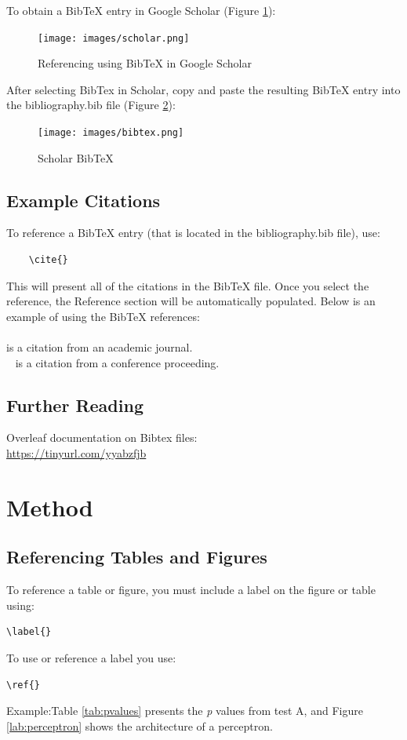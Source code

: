 \documentclass[12pt]{article}
\begin{document}
To obtain a BibTeX entry in Google Scholar (Figure \ref{lab:scholarBibTeX}):
\begin{figure}[ht!]
 	\centering
 	\caption{Referencing using BibTeX in Google Scholar}
 	\texttt{[image: images/scholar.png]}
 	\label{lab:scholarBibTeX}
 \end{figure}
 
 After selecting BibTex in Scholar, copy and paste the resulting BibTeX entry into the bibliography.bib file (Figure \ref{lab:BibTeX}):
 
 \begin{figure}[ht!]
 	\centering
 	\caption{Scholar BibTeX}
 	\texttt{[image: images/bibtex.png]}
 	\label{lab:BibTeX}
 \end{figure}




\subsection{Example Citations}
To reference a BibTeX entry (that is located in the bibliography.bib file), use:

\begin{verbatim}
    \cite{}
\end{verbatim}

This will present all of the citations in the BibTeX file. Once you select the reference, the Reference section will be automatically populated. Below is an example of using the BibTeX references:\\\\


\cite{Quille2019} is a citation from an academic journal.\\\
\cite{Quille:Gender} is a citation from a conference proceeding.



\subsection{Further Reading}
Overleaf documentation on Bibtex files: \\
\url{https://tinyurl.com/yyabzfjb}

\pagebreak




\section{Method}
\subsection{Referencing Tables and Figures}
To reference a table or figure, you must include a label on the figure or table using: 
\begin{verbatim}
\label{}  
\end{verbatim}
To use or reference a label you use:
\begin{verbatim}
\ref{}
\end{verbatim}
Example:Table \ref{tab:pvalues} presents the \textit{p} values from test A, and Figure \ref{lab:perceptron} shows the architecture of a perceptron.
\end{document}
